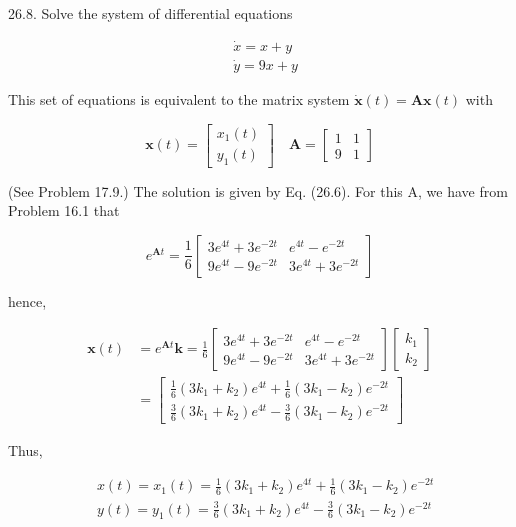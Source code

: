\documentclass[10pt]{article}
\begin{document}
26.8. Solve the system of differential equations

$$
\begin{aligned}
& \dot{x}=x+y \\
& \dot{y}=9 x+y
\end{aligned}
$$

This set of equations is equivalent to the matrix system $\dot{\mathbf{x}}(t)=\mathbf{A x}(t)$ with

$$
\mathbf{x}(t)=\left[\begin{array}{l}
x_{1}(t) \\
y_{1}(t)
\end{array}\right] \quad \mathbf{A}=\left[\begin{array}{ll}
1 & 1 \\
9 & 1
\end{array}\right]
$$

(See Problem 17.9.) The solution is given by Eq. (26.6). For this A, we have from Problem 16.1 that

$$
e^{\mathbf{A} t}=\frac{1}{6}\left[\begin{array}{cc}
3 e^{4 t}+3 e^{-2 t} & e^{4 t}-e^{-2 t} \\
9 e^{4 t}-9 e^{-2 t} & 3 e^{4 t}+3 e^{-2 t}
\end{array}\right]
$$

hence,

$$
\begin{aligned}
\mathbf{x}(t) & =e^{\mathbf{A} t} \mathbf{k}=\frac{1}{6}\left[\begin{array}{cc}
3 e^{4 t}+3 e^{-2 t} & e^{4 t}-e^{-2 t} \\
9 e^{4 t}-9 e^{-2 t} & 3 e^{4 t}+3 e^{-2 t}
\end{array}\right]\left[\begin{array}{l}
k_{1} \\
k_{2}
\end{array}\right] \\
& =\left[\begin{array}{l}
\frac{1}{6}\left(3 k_{1}+k_{2}\right) e^{4 t}+\frac{1}{6}\left(3 k_{1}-k_{2}\right) e^{-2 t} \\
\frac{3}{6}\left(3 k_{1}+k_{2}\right) e^{4 t}-\frac{3}{6}\left(3 k_{1}-k_{2}\right) e^{-2 t}
\end{array}\right]
\end{aligned}
$$

Thus,

$$
\begin{aligned}
& x(t)=x_{1}(t)=\frac{1}{6}\left(3 k_{1}+k_{2}\right) e^{4 t}+\frac{1}{6}\left(3 k_{1}-k_{2}\right) e^{-2 t} \\
& y(t)=y_{1}(t)=\frac{3}{6}\left(3 k_{1}+k_{2}\right) e^{4 t}-\frac{3}{6}\left(3 k_{1}-k_{2}\right) e^{-2 t}
\end{aligned}
$$
\end{document}

